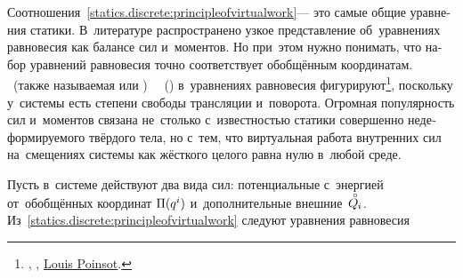 \begin{otherlanguage}{russian}
Соотношения~\eqref{statics.discrete:principleofvirtualwork}\:--- это самые общие уравнения статики.
В~литературе распространено узкое представление об~уравнениях равновесия как балансе сил и~моментов.
Но при~этом нужно понимать, что набор уравнений равновесия точно соответствует обобщённым координатам.
~(также называемая  или )
~~()
в~уравнениях равновесия фигурируют\footnote{ \textcolor{magenta}{} , ,    
\href{https://gallica.bnf.fr/ark:/12148/bpt6k6213152z.texteImage}{}
\href{https://en.wikipedia.org/wiki/Louis_Poinsot}{Louis Poinsot}.}\hbox{\hspace{-0.5ex},}
поскольку у~системы есть степени свободы трансляции и~поворота.
Огромная популярность сил и~моментов связана не~столько с~известностью статики совершенно недеформируемого твёрдого тела, но с~тем, что виртуальная работа внутренних сил на~смещениях системы как жёсткого целого равна нулю в~любой среде.

Пусть в~системе действуют два вида сил: потенциальные с~энергией от~обобщённых координат ${\Pi (q^i)}$ и~дополнительные внешние~${\mathcircabove{Q}_{\hspace{-0.1ex}i}}$.
Из~\eqref{statics.discrete:principleofvirtualwork} следуют уравнения равновесия


\end{otherlanguage}
